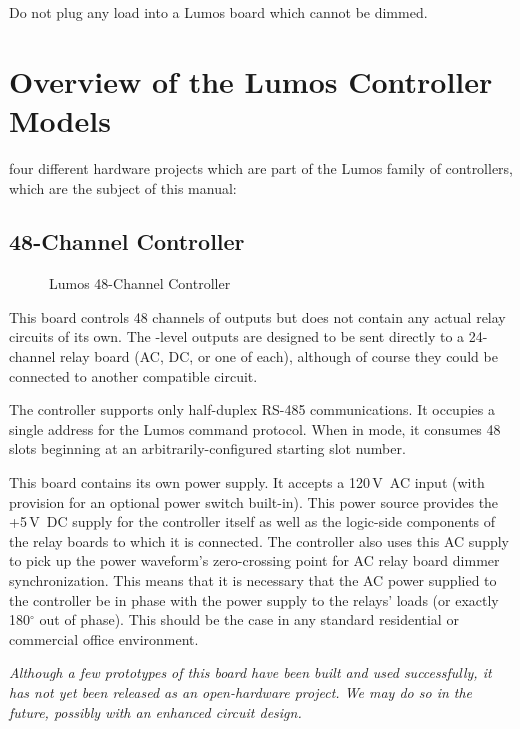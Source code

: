 \documentclass[letterpaper,twoside,onecolumn,openright,final]{memoir}
\begin{document}
Do not plug any load into a Lumos board which cannot be dimmed.

\chapter{Overview of the Lumos Controller Models}
 four different hardware projects which are part of the Lumos
family of controllers, which are the subject of this manual:
\section{48-Channel Controller}
\begin{figure}
  \begin{center}
  \end{center}
  \caption{Lumos 48-Channel Controller}
\end{figure}
This board controls 48 channels of outputs but does not contain any actual relay circuits of its own.
The -level outputs are designed to be sent directly to a 24-channel relay board (AC, DC,
or one of each), although of course they could be connected to another compatible circuit.

The controller supports only half-duplex RS-485 communications.
It occupies a single address for the Lumos command protocol.  When in  mode, it consumes
48 slots beginning at an arbitrarily-configured starting slot number.

This board contains its own power supply.  It accepts a 120\,V~AC input (with provision for an
optional power switch built-in).  This power source provides the +5\,V~DC supply for the controller
itself as well as the logic-side components of the relay boards to which it is connected.  The controller
also uses this AC supply to pick up the power waveform's zero-crossing point for AC relay board
dimmer synchronization.  This means that it is necessary that the AC power supplied to the controller
be in phase with the power supply to the relays' loads (or exactly 180$^\circ$ out of phase).  This should
be the case in any standard residential or commercial office environment.

\emph{Although a few prototypes of this board have been built and used successfully, it has not yet been
released as an open-hardware project.  We may do so in the future, possibly with an enhanced circuit
design.}
\end{document}
